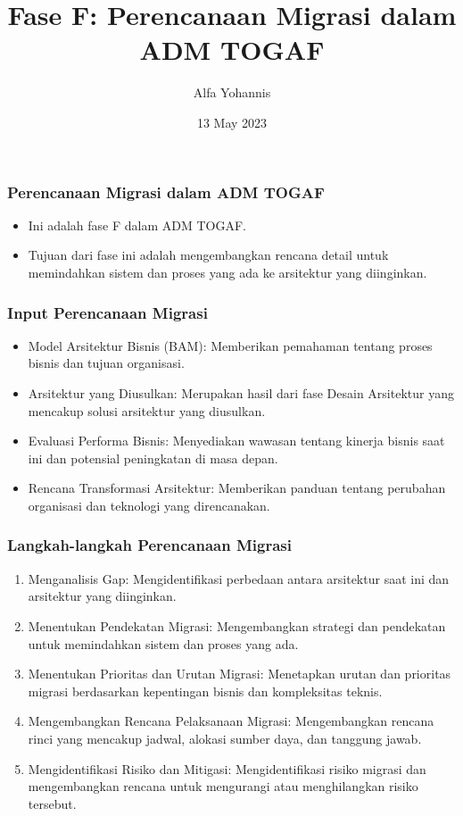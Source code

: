 \documentclass{beamer}
\title{Fase F: Perencanaan Migrasi dalam ADM TOGAF}
\author{Alfa Yohannis}
\date{13 May 2023}
\begin{document}
	
	\begin{frame}
		\titlepage
	\end{frame}
	
	\begin{frame}
		\frametitle{Perencanaan Migrasi dalam ADM TOGAF}
		\begin{itemize}
			\item Ini adalah fase F dalam ADM TOGAF.
			\item Tujuan dari fase ini adalah mengembangkan rencana detail untuk memindahkan sistem dan proses yang ada ke arsitektur yang diinginkan.
		\end{itemize}
	\end{frame}
	
	\begin{frame}
		\frametitle{Input Perencanaan Migrasi}
		\begin{itemize}
			\item Model Arsitektur Bisnis (BAM): Memberikan pemahaman tentang proses bisnis dan tujuan organisasi.
			\item Arsitektur yang Diusulkan: Merupakan hasil dari fase Desain Arsitektur yang mencakup solusi arsitektur yang diusulkan.
			\item Evaluasi Performa Bisnis: Menyediakan wawasan tentang kinerja bisnis saat ini dan potensial peningkatan di masa depan.
			\item Rencana Transformasi Arsitektur: Memberikan panduan tentang perubahan organisasi dan teknologi yang direncanakan.
		\end{itemize}
	\end{frame}
	
	\begin{frame}
		\frametitle{Langkah-langkah Perencanaan Migrasi}
		\begin{enumerate}
			\item Menganalisis Gap: Mengidentifikasi perbedaan antara arsitektur saat ini dan arsitektur yang diinginkan.
			\item Menentukan Pendekatan Migrasi: Mengembangkan strategi dan pendekatan untuk memindahkan sistem dan proses yang ada.
			\item Menentukan Prioritas dan Urutan Migrasi: Menetapkan urutan dan prioritas migrasi berdasarkan kepentingan bisnis dan kompleksitas teknis.
			\item Mengembangkan Rencana Pelaksanaan Migrasi: Mengembangkan rencana rinci yang mencakup jadwal, alokasi sumber daya, dan tanggung jawab.
			\item Mengidentifikasi Risiko dan Mitigasi: Mengidentifikasi risiko migrasi dan mengembangkan rencana untuk mengurangi atau menghilangkan risiko tersebut.
		\end{enumerate}
	\end{frame}
	
\end{document}

